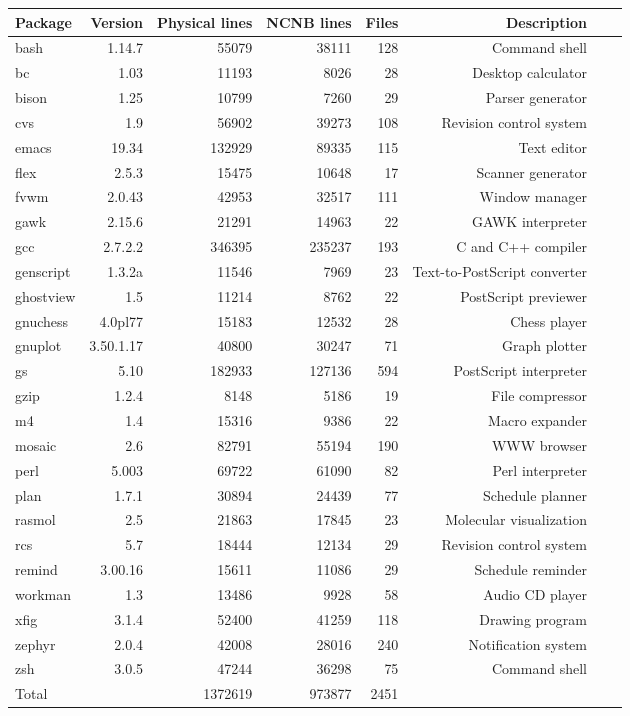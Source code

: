 \begin{tabular}{|l|r|r|r|r|r|r|r|} \hline
Package & Version & Physical lines & NCNB lines & Files & Description \\ \hline
bash & 1.14.7 & 55079 & 38111 & 128 & Command shell  \\ \hline
bc & 1.03 & 11193 & 8026 & 28 & Desktop calculator  \\ \hline
bison & 1.25 & 10799 & 7260 & 29 & Parser generator  \\ \hline
cvs & 1.9 & 56902 & 39273 & 108 & Revision control system  \\ \hline
emacs & 19.34 & 132929 & 89335 & 115 & Text editor \\ \hline
flex & 2.5.3 & 15475 & 10648 & 17 & Scanner generator  \\ \hline
fvwm & 2.0.43 & 42953 & 32517 & 111 & Window manager  \\ \hline
gawk & 2.15.6 & 21291 & 14963 & 22 & GAWK interpreter  \\ \hline
gcc & 2.7.2.2 & 346395 & 235237 & 193 & C and C++ compiler \\ \hline
genscript & 1.3.2a & 11546 & 7969 & 23 & Text-to-PostScript converter  \\ \hline
ghostview & 1.5 & 11214 & 8762 & 22 & PostScript previewer  \\ \hline
gnuchess & 4.0pl77 & 15183 & 12532 & 28 & Chess player  \\ \hline
gnuplot & 3.50.1.17 & 40800 & 30247 & 71 & Graph plotter  \\ \hline
gs & 5.10 & 182933 & 127136 & 594 & PostScript interpreter  \\ \hline
gzip & 1.2.4 & 8148 & 5186 & 19 & File compressor  \\ \hline
m4 & 1.4 & 15316 & 9386 & 22 & Macro expander  \\ \hline
mosaic & 2.6 & 82791 & 55194 & 190 & WWW browser \\ \hline
perl & 5.003 & 69722 & 61090 & 82 & Perl interpreter  \\ \hline
plan & 1.7.1 & 30894 & 24439 & 77 & Schedule planner  \\ \hline
rasmol & 2.5 & 21863 & 17845 & 23 & Molecular visualization \\ \hline
rcs & 5.7 & 18444 & 12134 & 29 & Revision control system  \\ \hline
remind & 3.00.16 & 15611 & 11086 & 29 & Schedule reminder  \\ \hline
workman & 1.3 & 13486 & 9928 & 58 & Audio CD player  \\ \hline
xfig & 3.1.4 & 52400 & 41259 & 118 & Drawing program  \\ \hline
zephyr & 2.0.4 & 42008 & 28016 & 240 & Notification system  \\ \hline
zsh & 3.0.5 & 47244 & 36298 & 75 & Command shell  \\ \hline
Total &   & 1372619 & 973877 & 2451 &   \\ \hline
\end{tabular}
